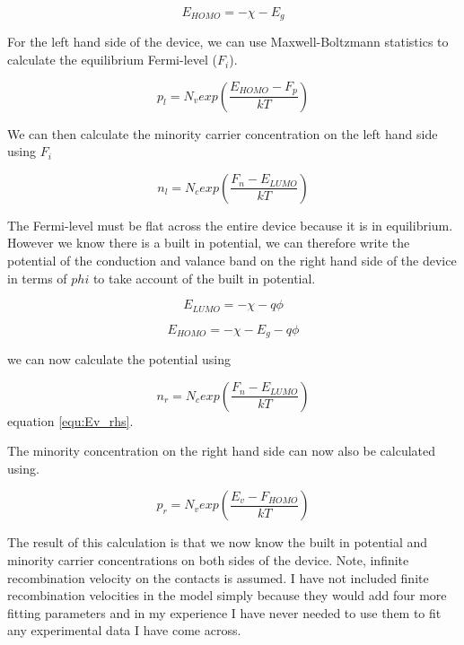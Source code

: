 \begin{equation}
E_{HOMO}=-\chi-E_{g}
\end{equation}

For the left hand side of the device, we can use Maxwell-Boltzmann statistics to calculate the equilibrium Fermi-level ($F_i$).

\begin{equation}
p_{l}=N_v exp \left(\frac{E_{HOMO}-F_p}{kT} \right)
\end{equation}

We can then calculate the minority carrier concentration on the left hand side using $F_i$

\begin{equation}
n_{l}=N_c exp \left (\frac{F_n-E_{LUMO}}{kT} \right)
\end{equation}

The Fermi-level must be flat across the entire device because it is in equilibrium.  However we know there is a built in potential, we can therefore write the potential of the conduction and valance band on the right hand side of the device in terms of $phi$ to take account of the built in potential.

\begin{equation}
E_{LUMO}=-\chi-q\phi
\label{equ:Ev_rhs}
\end{equation}

\begin{equation}
E_{HOMO}=-\chi-E_g-q\phi
\end{equation}

we can now calculate the potential using

\begin{equation}
n_{r}=N_c exp \left (\frac{F_n-E_{LUMO}}{kT} \right)
\end{equation}
equation \ref{equ:Ev_rhs}.

The minority concentration on the right hand side can now also be calculated using.

\begin{equation}
p_{r}=N_v exp \left (\frac{E_v-F_{HOMO}}{kT} \right)
\end{equation}

The result of this calculation is that we now know the built in potential and minority carrier concentrations on both sides of the device.  Note, infinite recombination velocity on the contacts is assumed.  I have not included finite recombination velocities in the model simply because they would add four more fitting parameters and in my experience I have never needed to use them to fit any experimental data I have come across.

